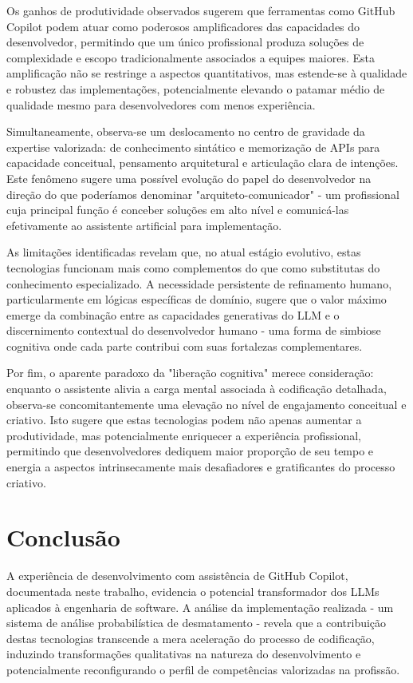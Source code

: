 \documentclass[12pt,a4paper]{article}
\begin{document}
Os ganhos de produtividade observados sugerem que ferramentas como GitHub Copilot podem atuar como poderosos amplificadores das capacidades do desenvolvedor, permitindo que um único profissional produza soluções de complexidade e escopo tradicionalmente associados a equipes maiores. Esta amplificação não se restringe a aspectos quantitativos, mas estende-se à qualidade e robustez das implementações, potencialmente elevando o patamar médio de qualidade mesmo para desenvolvedores com menos experiência.

Simultaneamente, observa-se um deslocamento no centro de gravidade da expertise valorizada: de conhecimento sintático e memorização de APIs para capacidade conceitual, pensamento arquitetural e articulação clara de intenções. Este fenômeno sugere uma possível evolução do papel do desenvolvedor na direção do que poderíamos denominar "arquiteto-comunicador" - um profissional cuja principal função é conceber soluções em alto nível e comunicá-las efetivamente ao assistente artificial para implementação.

As limitações identificadas revelam que, no atual estágio evolutivo, estas tecnologias funcionam mais como complementos do que como substitutas do conhecimento especializado. A necessidade persistente de refinamento humano, particularmente em lógicas específicas de domínio, sugere que o valor máximo emerge da combinação entre as capacidades generativas do LLM e o discernimento contextual do desenvolvedor humano - uma forma de simbiose cognitiva onde cada parte contribui com suas fortalezas complementares.

Por fim, o aparente paradoxo da "liberação cognitiva" merece consideração: enquanto o assistente alivia a carga mental associada à codificação detalhada, observa-se concomitantemente uma elevação no nível de engajamento conceitual e criativo. Isto sugere que estas tecnologias podem não apenas aumentar a produtividade, mas potencialmente enriquecer a experiência profissional, permitindo que desenvolvedores dediquem maior proporção de seu tempo e energia a aspectos intrinsecamente mais desafiadores e gratificantes do processo criativo.

\section{Conclusão}

A experiência de desenvolvimento com assistência de GitHub Copilot, documentada neste trabalho, evidencia o potencial transformador dos LLMs aplicados à engenharia de software. A análise da implementação realizada - um sistema de análise probabilística de desmatamento - revela que a contribuição destas tecnologias transcende a mera aceleração do processo de codificação, induzindo transformações qualitativas na natureza do desenvolvimento e potencialmente reconfigurando o perfil de competências valorizadas na profissão.
\end{document}
